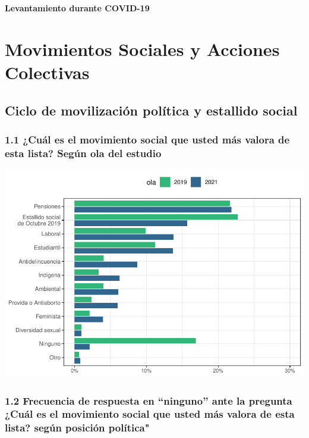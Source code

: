\documentclass[
  12pt,
]{book}
\begin{document}
\textbf{Levantamiento durante COVID-19}

\hypertarget{movimientos-sociales-y-acciones-colectivas}{%
\chapter{Movimientos Sociales y Acciones Colectivas}\label{movimientos-sociales-y-acciones-colectivas}}

\hypertarget{ciclo-de-movilizaciuxf3n-poluxedtica-y-estallido-social}{%
\section{Ciclo de movilización política y estallido social}\label{ciclo-de-movilizaciuxf3n-poluxedtica-y-estallido-social}}

\hypertarget{cuuxe1l-es-el-movimiento-social-que-usted-muxe1s-valora-de-esta-lista-seguxfan-ola-del-estudio}{%
\subsection{1.1 ¿Cuál es el movimiento social que usted más valora de esta lista? Según ola del estudio}\label{cuuxe1l-es-el-movimiento-social-que-usted-muxe1s-valora-de-esta-lista-seguxfan-ola-del-estudio}}

\includegraphics{reporte-elsoc_files/figure-latex/unnamed-chunk-6-1.pdf}

\hypertarget{frecuencia-de-respuesta-en-ninguno-ante-la-pregunta-cuuxe1l-es-el-movimiento-social-que-usted-muxe1s-valora-de-esta-lista-seguxfan-posiciuxf3n-poluxedtica}{%
\subsection{1.2 Frecuencia de respuesta en ``ninguno'' ante la pregunta ¿Cuál es el movimiento social que usted más valora de esta lista? según posición política"}\label{frecuencia-de-respuesta-en-ninguno-ante-la-pregunta-cuuxe1l-es-el-movimiento-social-que-usted-muxe1s-valora-de-esta-lista-seguxfan-posiciuxf3n-poluxedtica}}
\end{document}
